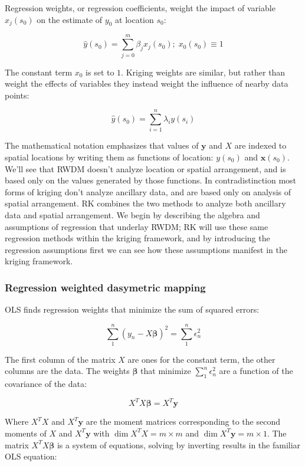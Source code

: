 \documentclass[draft]{article}
\begin{document}
Regression weights, or regression coefficients, weight the impact of variable $x_j(s_0)$ on the estimate of $y_0$ at location $s_0$:

\[\hat{y}(s_0) = \sum_{j=0}^m \beta_j x_j(s_0); \; x_0(s_0) \equiv 1\]

The constant term $x_0$ is set to $1$.  Kriging weights are similar, but rather than weight the effects of variables they instead weight the influence of nearby data points:

\[\hat{y}(s_0) = \sum_{i=1}^n \lambda_i y(s_i)\] %

The mathematical notation emphasizes that values of $\bm{y}$ and $X$ are indexed to spatial locations by writing them as functions of location: $y(s_0)$ and $\bm{x}(s_0)$.  We'll see that RWDM doesn't analyze location or spatial arrangement, and is based only on the values generated by those functions.  In contradistinction most forms of kriging don't analyze ancillary data, and are based only on analysis of spatial arrangement.  RK combines the two methods to analyze both ancillary data and spatial arrangement.  We begin by describing the algebra and assumptions of regression that underlay RWDM; RK will use these same regression methods within the kriging framework, and by introducing the regression assumptions first we can see how these assumptions manifest in the kriging framework.


\subsubsection{Regression weighted dasymetric mapping}

OLS finds regression weights that minimize the sum of squared errors:

\[\sum_1^n (y_n - X \bm{\beta})^2 = \sum_1^n \epsilon_{n}^2 \]

The first column of the matrix $X$ are ones for the constant term, the other columns are the data.  The weights $\bm{\beta}$ that minimize $\sum_1^n \epsilon_{n}^2$ are a function of the covariance of the data:

\[X^T X \bm{\beta} = X^T \bm{y} \]

Where $X^TX$ and $X^T\bm{y}$ are the moment matrices corresponding to the second moments of $X$ and $X^T\bm{y}$ with $\dim{X^TX}=m \times m$ and $\dim{X^T\bm{y}}=m \times 1$.  The matrix $X^T X \bm{\beta}$ is a system of equations, solving by inverting results in the familiar OLS equation:
\end{document}

